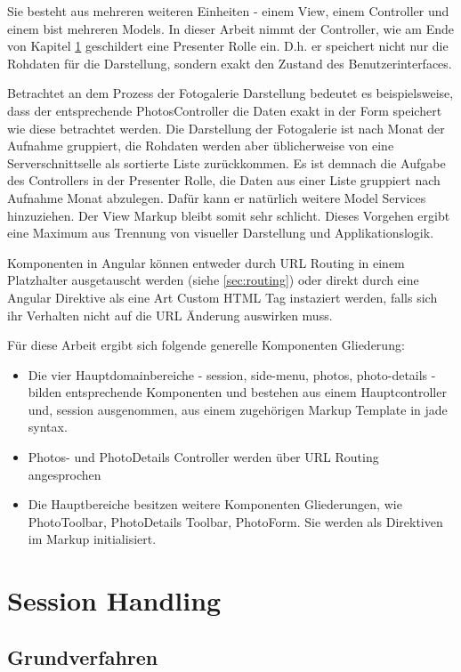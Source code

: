 Sie besteht aus mehreren weiteren Einheiten - einem View, einem Controller und einem bist mehreren Models. In dieser Arbeit nimmt der Controller, wie am Ende von  Kapitel \ref{} geschildert eine Presenter Rolle ein. D.h. er speichert nicht nur die Rohdaten für die Darstellung, sondern exakt den Zustand des Benutzerinterfaces. 

Betrachtet an dem Prozess der Fotogalerie Darstellung bedeutet es beispielsweise, dass der entsprechende PhotosController die Daten exakt in der Form speichert wie diese betrachtet werden. Die Darstellung der Fotogalerie ist nach Monat der Aufnahme gruppiert, die Rohdaten werden aber üblicherweise von eine Serverschnittselle als sortierte Liste zurückkommen. Es ist demnach die Aufgabe des Controllers in der Presenter Rolle, die Daten aus einer Liste gruppiert nach Aufnahme Monat abzulegen. Dafür kann er natürlich weitere Model Services hinzuziehen. Der View Markup bleibt somit sehr schlicht. Dieses Vorgehen ergibt eine Maximum aus Trennung von visueller Darstellung und Applikationslogik.

Komponenten in Angular können entweder durch URL Routing in einem Platzhalter ausgetauscht werden (siehe \ref{sec:routing}) oder direkt durch eine Angular Direktive als eine Art Custom HTML Tag instaziert werden, falls sich ihr Verhalten nicht auf die URL Änderung auswirken muss. 

Für diese Arbeit ergibt sich folgende generelle Komponenten Gliederung:

\begin{itemize}
\item Die vier Hauptdomainbereiche - session, side-menu, photos, photo-details - bilden entsprechende Komponenten und bestehen aus einem Hauptcontroller und, session ausgenommen, aus einem zugehörigen Markup Template in \gls{jade} syntax. 
\item Photos- und PhotoDetails Controller werden über URL Routing angesprochen
\item Die Hauptbereiche besitzen weitere Komponenten Gliederungen, wie PhotoToolbar, PhotoDetails Toolbar, PhotoForm. Sie werden als Direktiven im Markup initialisiert.
\end{itemize}

\section{Session Handling}

\subsection{Grundverfahren}
\label{sec:session_handling_basics}

